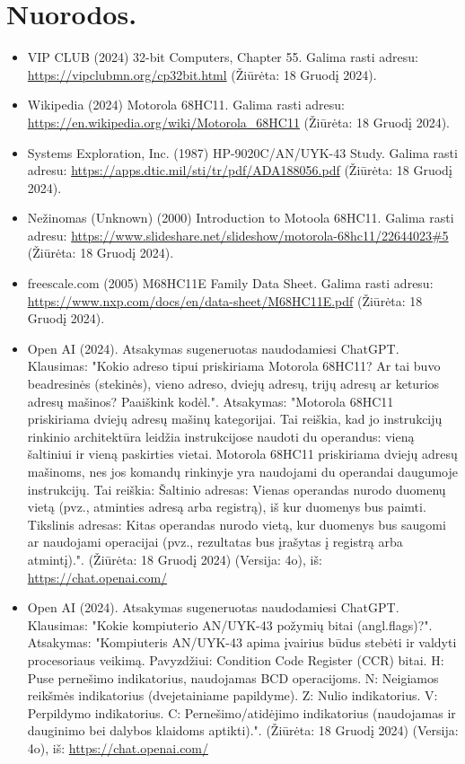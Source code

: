\documentclass[a4paper,12pt]{article}
\begin{document}
\section{Nuorodos.}
\begin{itemize}
    \item VIP CLUB (2024) 32-bit Computers, Chapter 55. Galima rasti adresu: \url{https://vipclubmn.org/cp32bit.html} (Žiūrėta: 18 Gruodį 2024).
    \item Wikipedia (2024) Motorola 68HC11. Galima rasti adresu: \url{https://en.wikipedia.org/wiki/Motorola_68HC11} (Žiūrėta: 18 Gruodį 2024).
    \item Systems Exploration, Inc. (1987) HP-9020C/AN/UYK-43 Study. Galima rasti adresu: \url{https://apps.dtic.mil/sti/tr/pdf/ADA188056.pdf} (Žiūrėta: 18 Gruodį 2024).
    \item Nežinomas (Unknown) (2000) Introduction to Motoola 68HC11. Galima rasti adresu: \url{https://www.slideshare.net/slideshow/motorola-68hc11/22644023#5} (Žiūrėta: 18 Gruodį 2024).
    \item freescale.com (2005) M68HC11E Family Data Sheet. Galima rasti adresu: \url{https://www.nxp.com/docs/en/data-sheet/M68HC11E.pdf} (Žiūrėta: 18 Gruodį 2024).
    \item Open AI (2024). Atsakymas sugeneruotas naudodamiesi ChatGPT. Klausimas: "Kokio adreso tipui priskiriama Motorola 68HC11? Ar tai buvo beadresinės (stekinės), vieno adreso, dviejų adresų,  trijų adresų ar keturios adresų mašinos? Paaiškink kodėl.". Atsakymas: "Motorola 68HC11 priskiriama dviejų adresų mašinų kategorijai. Tai reiškia, kad jo instrukcijų rinkinio architektūra leidžia instrukcijose naudoti du operandus: vieną šaltiniui ir vieną paskirties vietai. Motorola 68HC11 priskiriama dviejų adresų mašinoms, nes jos komandų rinkinyje yra naudojami du operandai daugumoje instrukcijų. Tai reiškia: Šaltinio adresas: Vienas operandas nurodo duomenų vietą (pvz., atminties adresą arba registrą), iš kur duomenys bus paimti. Tikslinis adresas: Kitas operandas nurodo vietą, kur duomenys bus saugomi ar naudojami operacijai (pvz., rezultatas bus įrašytas į registrą arba atmintį).". (Žiūrėta: 18 Gruodį 2024) (Versija: 4o), iš: \url{https://chat.openai.com/}
    \item Open AI (2024). Atsakymas sugeneruotas naudodamiesi ChatGPT. Klausimas: "Kokie kompiuterio AN/UYK-43 požymių bitai (angl.flags)?". Atsakymas: "Kompiuteris AN/UYK-43 apima įvairius būdus stebėti ir valdyti procesoriaus veikimą. Pavyzdžiui: Condition Code Register (CCR) bitai. H: Puse pernešimo indikatorius, naudojamas BCD operacijoms. N: Neigiamos reikšmės indikatorius (dvejetainiame papildyme). Z: Nulio indikatorius. V: Perpildymo indikatorius. C: Pernešimo/atidėjimo indikatorius (naudojamas ir dauginimo bei dalybos klaidoms aptikti).". (Žiūrėta: 18 Gruodį 2024) (Versija: 4o), iš: \url{https://chat.openai.com/}

\end{itemize}
\end{document}
